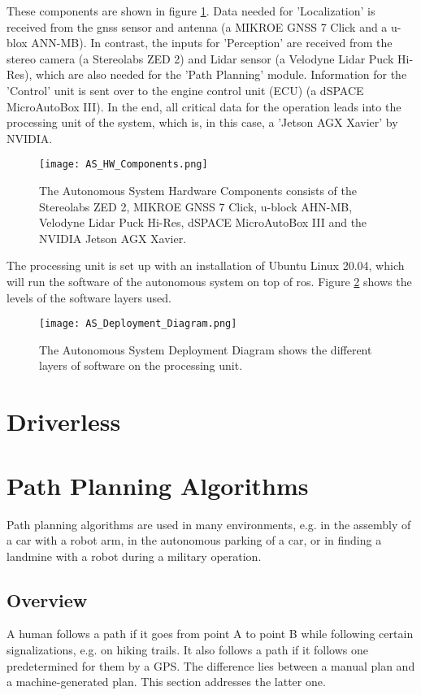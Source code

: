 These components are shown in figure \ref{fig:AS HW Components}. Data needed for 'Localization' is received from the \acrshort{gnss} sensor and antenna (a MIKROE GNSS 7 Click and a u-blox ANN-MB). In contrast, the inputs for 'Perception' are received from the stereo camera (a Stereolabs ZED 2) and Lidar sensor (a Velodyne Lidar Puck Hi-Res), which are also needed for the 'Path Planning' module. Information for the 'Control' unit is sent over to the engine control unit (ECU) (a dSPACE MicroAutoBox III). In the end, all critical data for the operation leads into the processing unit of the system, which is, in this case, a 'Jetson AGX Xavier' by NVIDIA.
\begin{figure}[H]
    \centering
    \texttt{[image: AS\_HW\_Components.png]}
    \caption{The Autonomous System Hardware Components consists of the Stereolabs ZED 2, MIKROE GNSS 7 Click, u-block AHN-MB, Velodyne Lidar Puck Hi-Res, dSPACE MicroAutoBox III and the NVIDIA Jetson AGX Xavier.}
    \label{fig:AS HW Components}
\end{figure}

The processing unit is set up with an installation of Ubuntu Linux 20.04, which will run the software of the autonomous system on top of \acrshort{ros}. Figure \ref{fig:AS Deployment Diagram} shows the levels of the software layers used.
\begin{figure}[H]
    \centering
    \texttt{[image: AS\_Deployment\_Diagram.png]}
    \caption{The Autonomous System Deployment Diagram shows the different layers of software on the processing unit.}
    \label{fig:AS Deployment Diagram}
\end{figure}

\section{Driverless} \label{sec:Driverless}
\lipsum[1] %

\section{Path Planning Algorithms} \label{sec:Path Planning Algorithms}
Path planning algorithms are used in many environments, e.g. in the assembly of a car with a robot arm, in the autonomous parking of a car, or in finding a landmine with a robot during a military operation.

\subsection{Overview} \label{sec:Overview Path Planning Algorithms}
A human follows a path if it goes from point A to point B while following certain signalizations, e.g. on hiking trails. It also follows a path if it follows one predetermined for them by a GPS. The difference lies between a manual plan and a machine-generated plan. This section addresses the latter one.

